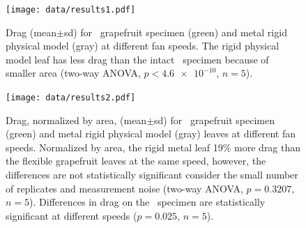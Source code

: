 \begin{figure}
\begin{center}
\texttt{[image: data/results1.pdf]}
\end{center}
\caption{Drag (mean$\pm$sd) for \Cxparadisi\ grapefruit specimen (green) and metal rigid physical model (gray) at different fan speeds. The rigid physical model leaf has less drag than the intact \Cxparadisi\ specimen because of smaller area (two-way ANOVA, $p<\num{4.6e-10}$, $n=5$).}
\label{fig:results:drag}
\end{figure}

\begin{figure}
\begin{center}
\texttt{[image: data/results2.pdf]}
\end{center}
\caption{Drag, normalized by area, (mean$\pm$sd) for \Cxparadisi\ grapefruit specimen (green) and metal rigid physical model (gray) leaves at different fan speeds. Normalized by area, the rigid metal leaf 19\% more drag than the flexible grapefruit leaves at the same speed, however, the differences are not statistically significant consider the small number of replicates and measurement noise (two-way ANOVA, $p=0.3207$, $n=5$). Differences in drag on the \Cxparadisi\ specimen are statistically significant at different speeds ($p=0.025$, $n=5$).}
\label{fig:results:dragarea}
\end{figure}






